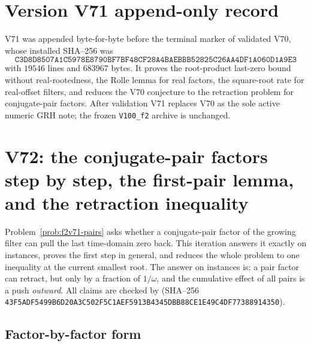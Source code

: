 \documentclass[11pt]{article}
\theoremstyle{definition}
\theoremstyle{remark}
\begin{document}
\section*{Version V71 append-only record}

V71 was appended byte-for-byte before the terminal marker of validated
V70, whose installed SHA--256 was
\[
 \texttt{C3D8D8507A1C5978E8790BF7BF48CF28}
 \allowbreak\texttt{A4BAEBBB52825C26AA4DF1A060D1A9E3}
\]
with \(19546\) lines and \(683967\) bytes.  It proves the root-product
last-zero bound without real-rootedness, the Rolle lemma for real
factors, the square-root rate for real-offset filters, and reduces the
V70 conjecture to the retraction problem for conjugate-pair factors.
After validation V71 replaces V70 as the sole active numeric GRH note;
the frozen \texttt{V100\_f2} archive is unchanged.





\clearpage
\section{V72: the conjugate-pair factors step by step, the first-pair lemma, and the retraction inequality}
\label{sec:f2v72-pairs}
\begingroup
\setcounter{equation}{0}
\renewcommand{\theequation}{N72.\arabic{equation}}
\renewcommand{\theHequation}{f2v72.\arabic{equation}}

Problem~\ref{prob:f2v71-pairs} asks whether a conjugate-pair factor of the
growing filter can pull the last time-domain zero back.  This iteration
answers it exactly on instances, proves the first step in general, and
reduces the whole problem to one inequality at the current smallest root.
The answer on instances is: a pair factor can retract, but only by a
fraction of \(1/\omega\), and the cumulative effect of all pairs is a
push \emph{outward}.  All claims are checked by
 (SHA--256
\texttt{43F5ADF5499B6D20A3C502F5C1AEF591}\allowbreak\texttt{3B4345DBB88CE1E49C4DF77388914350}).

\subsection{Factor-by-factor form}
\end{document}
